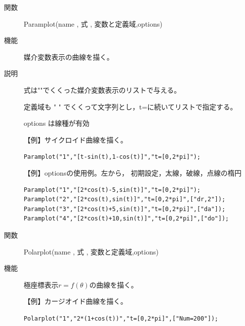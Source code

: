 \documentclass[papersize,a4paper,10pt,uplatex]{jsarticle}
\begin{document}
\begin{description}
\vspace{\baselineskip}
\hspace{20mm}

\vspace{\baselineskip}
\hypertarget{paramplot}{}
\item[関数]Paramplot(name , 式 , 変数と定義域,options)
\item[機能]媒介変数表示の曲線を描く。
\item[説明]式は""でくくった媒介変数表示のリストで与える。

定義域も " " でくくって文字列とし，t=に続いてリストで指定する。

options は線種が有効

\vspace{\baselineskip}
【例】サイクロイド曲線を描く。

\hspace{10mm} \verb|Paramplot("1","[t-sin(t),1-cos(t)]","t=[0,2*pi]");|

\vspace{\baselineskip}
\hspace{20mm}

\vspace{\baselineskip}
【例】optionsの使用例。左から， 初期設定，太線，破線，点線の楕円
\begin{verbatim}
Paramplot("1","[2*cos(t)-5,sin(t)]","t=[0,2*pi]");
Paramplot("2","[2*cos(t),sin(t)]","t=[0,2*pi]",["dr,2"]);
Paramplot("3","[2*cos(t)+5,sin(t)]","t=[0,2*pi]",["da"]);
Paramplot("4","[2*cos(t)+10,sin(t)]","t=[0,2*pi]",["do"]);
\end{verbatim}
\begin{center}  \end{center}


\vspace{\baselineskip}
\hypertarget{polarplot}{}
\item[関数]Polarplot(name , 式 , 変数と定義域,options)
\item[機能]極座標表示$r=f(\theta)$の曲線を描く。

\vspace{\baselineskip}
【例】カージオイド曲線を描く。

\hspace{10mm}\verb|Polarplot("1","2*(1+cos(t))","t=[0,2*pi]",["Num=200"]);|


\end{description}
\end{document}
